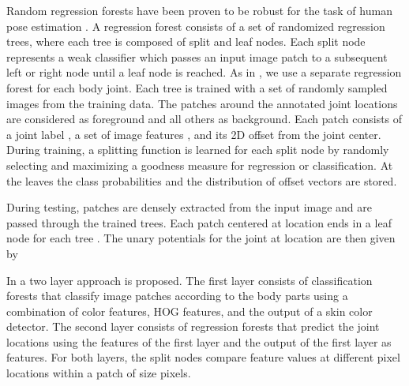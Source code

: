 \documentclass[a4paper, 10pt, conference]{ieeeconf}      \usepackage{FG2017}
\begin{document}
Random regression forests have been proven to be robust for the task of human pose estimation \cite{shotton2011real, minsun_cvpr2012, dantone_tpami2014}. A regression forest  consists of a set of randomized regression trees, where each tree  is composed of split and leaf nodes. Each split node represents a weak classifier which passes an input image patch  to a subsequent left or right node until a leaf node  is reached. As in \cite{dantone_tpami2014}, we use a separate regression forest for each body joint. Each tree is trained with a set of randomly sampled images from the training data. The patches around the annotated joint locations are considered as foreground and all others as background. Each patch consists of a joint label , a set of image features , and its 2D offset  from the joint center. 
During training, a splitting function is learned for each split node by randomly selecting and maximizing a goodness measure for regression or classification.  
At the leaves the class probabilities  and the distribution of offset vectors  are stored.          

During testing, patches are densely extracted from the input image  and are passed through the trained trees. 
Each patch centered at location  ends in a leaf node  for each tree .
The unary potentials  for the joint  at location  are then given by 


In \cite{dantone_tpami2014} a two layer approach is proposed. The first layer consists of classification forests that classify image patches according to the body parts using a combination of color features, HOG features, and the output of a skin color detector. The second layer consists of regression forests that predict the joint locations using the features of the first layer and the output of the first layer as features. For both layers, the split nodes compare feature values at different pixel locations within a patch of size  pixels.   
\end{document}
